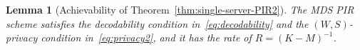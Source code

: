 \documentclass[letterpaper, 10 pt, conference]{ieeeconf}
\newtheorem{lemma}{Lemma}
\begin{document}
\begin{lemma}[Achievability of Theorem~\ref{thm:single-server-PIR2}]
The MDS PIR scheme satisfies the decodability condition in~\eqref{eq:decodability} and the $(W,S)$-privacy condition in~\eqref{eq:privacy2}, and it has the rate of $R = (K-M)^{-1}$.%
\end{lemma}
\end{document}
